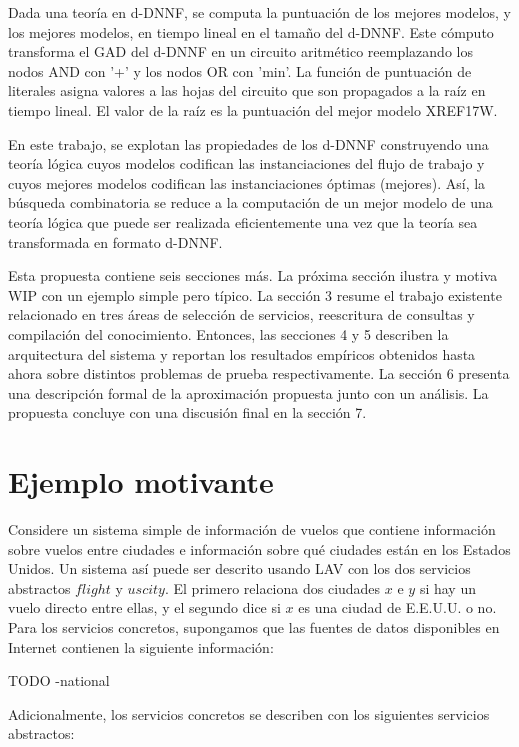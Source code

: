 \documentclass{article}
\begin{document}
Dada una teoría en d-DNNF, se computa la puntuación de los mejores modelos, y
los mejores modelos, en tiempo lineal en el tamaño del d-DNNF. Este cómputo
transforma el GAD del d-DNNF en un circuito aritmético reemplazando los nodos
AND con '+' y los nodos OR con 'min'. La función de puntuación de literales
asigna valores a las hojas del circuito que son propagados a la raíz en tiempo
lineal. El valor de la raíz es la puntuación del mejor modelo XREF17W.

En este trabajo, se explotan las propiedades de los d-DNNF construyendo una
teoría lógica cuyos modelos codifican las instanciaciones del flujo de trabajo
y cuyos mejores modelos codifican las instanciaciones óptimas (mejores). Así, la
búsqueda combinatoria se reduce a la computación de un mejor modelo de una
teoría lógica que puede ser realizada eficientemente una vez que la teoría sea
transformada en formato d-DNNF.

Esta propuesta contiene seis secciones más. La próxima sección ilustra y motiva
WIP con un ejemplo simple pero típico. La sección 3 resume el trabajo existente
relacionado en tres áreas de selección de servicios, reescritura de consultas y
compilación del conocimiento. Entonces, las secciones 4 y 5 describen la
arquitectura del sistema y reportan los resultados empíricos obtenidos hasta
ahora sobre distintos problemas de prueba respectivamente. La sección 6 presenta
una descripción formal de la aproximación propuesta junto con un análisis. La
propuesta concluye con una discusión final en la sección 7.

\section{Ejemplo motivante}

Considere un sistema simple de información de vuelos que contiene información
sobre vuelos entre ciudades e información sobre qué ciudades están en los
Estados Unidos. Un sistema así puede ser descrito usando LAV con los dos servicios
abstractos $flight$ y $uscity$. El primero relaciona dos ciudades $x$ e $y$ si
hay un vuelo directo entre ellas, y el segundo dice si $x$ es una ciudad de
E.E.U.U.  o no. Para los servicios concretos, supongamos que las fuentes de
datos disponibles en Internet contienen la siguiente información:

\begin{itemize}
TODO
-national
\end{itemize}

Adicionalmente, los servicios concretos se describen con los siguientes
servicios abstractos:
\end{document}

